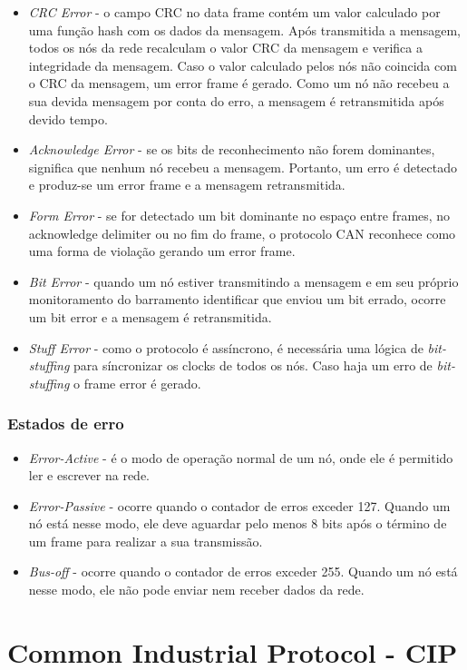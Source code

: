 \begin{itemize}
\item {\it CRC Error} - o campo CRC no data frame contém um valor calculado por uma função hash com os dados da mensagem. Após transmitida a mensagem, todos os nós da rede recalculam o valor CRC da mensagem e verifica a integridade da mensagem. Caso o valor calculado pelos nós não coincida com o CRC da mensagem, um error frame é gerado. Como um nó não recebeu a sua devida mensagem por conta do erro, a mensagem é retransmitida após devido tempo.
\item {\it Acknowledge Error} - se os bits de reconhecimento não forem dominantes, significa que nenhum nó recebeu a mensagem. Portanto, um erro é detectado e produz-se um error frame e a mensagem retransmitida.
\item {\it Form Error} - se for detectado um bit dominante no espaço entre frames, no acknowledge delimiter ou no fim do frame, o protocolo CAN reconhece como uma forma de violação gerando um error frame.
\item {\it Bit Error} - quando um nó estiver transmitindo a mensagem e em seu próprio monitoramento do barramento identificar que enviou um bit errado, ocorre um bit error e a mensagem é retransmitida.
\item {\it Stuff Error} - como o protocolo é assíncrono, é necessária uma lógica de {\it bit-stuffing} para síncronizar os clocks de todos os nós. Caso haja um erro de {\it bit-stuffing} o frame error é gerado.
\end{itemize}

\subsubsection{Estados de erro}

\begin{itemize}
\item {\it Error-Active} - é o modo de operação normal de um nó, onde ele é permitido ler e escrever na rede.
\item {\it Error-Passive} - ocorre quando o contador de erros exceder 127. Quando um nó está nesse modo, ele deve aguardar pelo menos 8 bits após o término de um frame para realizar a sua transmissão.
\item {\it Bus-off} - ocorre quando o contador de erros exceder 255. Quando um nó está nesse modo, ele não pode enviar nem receber dados da rede.
\end{itemize}

\section{Common Industrial Protocol - CIP}

